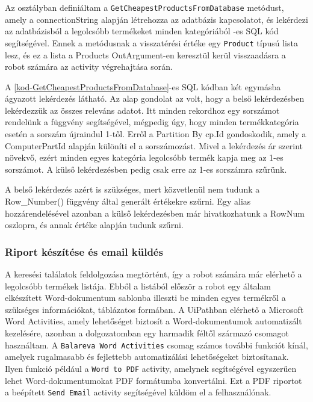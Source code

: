 \documentclass[
]{thesis-ekf}
\theoremstyle{definition}
\theoremstyle{remark}
\begin{document}
Az osztályban definiáltam a \texttt{GetCheapestProductsFromDatabase} metódust, amely a connectionString alapján létrehozza az adatbázis kapcsolatot, és lekérdezi az adatbázisból a legolcsóbb termékeket minden kategóriából -es SQL kód segítségével. Ennek a metódusnak a visszatérési értéke egy \texttt{Product} típusú lista lesz, és ez a lista a Products OutArgument-en keresztül kerül visszaadásra a robot számára az activity végrehajtása során.


\newpage
A \ref{kod-GetCheapestProductsFromDatabase}-es SQL kódban két egymásba ágyazott lekérdezés látható. Az alap gondolat az volt, hogy a belső lekérdezésben lekérdezzük az összes releváns adatot. Itt minden rekordhoz egy sorszámot rendelünk a  függvény segítségével, mégpedig úgy, hogy minden termékkategória esetén a sorszám újraindul 1-től. Erről a Partition By cp.Id gondoskodik, amely a ComputerPartId alapján különíti el a sorszámozást. Mivel a lekérdezés ár szerint növekvő, ezért minden egyes kategória legolcsóbb termék kapja meg az 1-es sorszámot. A külső lekérdezésben pedig csak erre az 1-es sorszámra szűrünk.

A belső lekérdezés azért is szükséges, mert közvetlenül nem tudunk a Row\_Number() függvény által generált értékekre szűrni. Egy alias hozzárendelésével azonban a külső lekérdezésben már hivatkozhatunk a RowNum oszlopra, és annak értéke alapján tudunk szűrni.

\subsubsection*{Riport készítése és email küldés}
A keresési találatok feldolgozása megtörtént, így a robot számára már elérhető a legolcsóbb termékek listája. Ebből a listából először a robot egy általam elkészített Word-dokumentum sablonba illeszti be minden egyes termékről a szükséges információkat, táblázatos formában. A UiPathban elérhető a Microsoft Word Activities, amely lehetőséget biztosít a Word-dokumentumok automatizált kezelésére, azonban a dolgozatomban egy harmadik féltől származó csomagot használtam. A \texttt{Balareva Word Activities} csomag számos további funkciót kínál, amelyek rugalmasabb és fejlettebb automatizálási lehetőségeket biztosítanak. Ilyen funkció például a \texttt{Word to PDF} activity, amelynek segítségével egyszerűen lehet Word-dokumentumokat PDF formátumba konvertálni. Ezt a PDF riportot a beépített \texttt{Send Email} activity segítségével küldöm el a felhasználónak.
\end{document}

